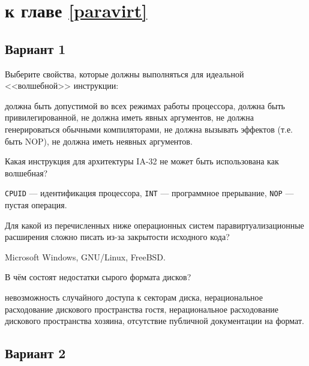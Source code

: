 \section{\Questions к главе \ref{paravirt}} %

\subsection*{Вариант 1}

\begin{questions}

\question[3] Выберите свойства, которые должны выполняться для идеальной <<волшебной>> инструкции:
\begin{choices}
    \correctchoice должна быть допустимой во всех режимах работы процессора,
    \choice должна быть привилегированной,
    \choice не должна иметь явных аргументов,
    \correctchoice не должна генерироваться обычными компиляторами,
    \correctchoice не должна вызывать эффектов (т.е. быть NOP),
    \choice не должна иметь неявных аргументов.
\end{choices}

\question[3] Какая инструкция для архитектуры IA-32 не может быть использована как волшебная?
\begin{choices}
\choice \texttt{CPUID} — идентификация процессора,
\correctchoice \texttt{INT} — программное прерывание,
\choice \texttt{NOP} — пустая операция.
\end{choices}

\question[3] Для какой из перечисленных ниже операционных систем паравиртуализационные расширения сложно писать из-за закрытости исходного кода?
\begin{choices}
\correctchoice Microsoft Windows,
\choice GNU/Linux,
\choice FreeBSD.
\end{choices}

\question[3] В чём состоят недостатки сырого формата дисков?
\begin{choices}
\choice невозможность случайного доступа к секторам диска,
\choice нерациональное расходование дискового пространства гостя,
\correctchoice нерациональное расходование дискового пространства хозяина,
\choice отсутствие публичной документации на формат.
\end{choices}

\end{questions}

\subsection*{Вариант 2}

